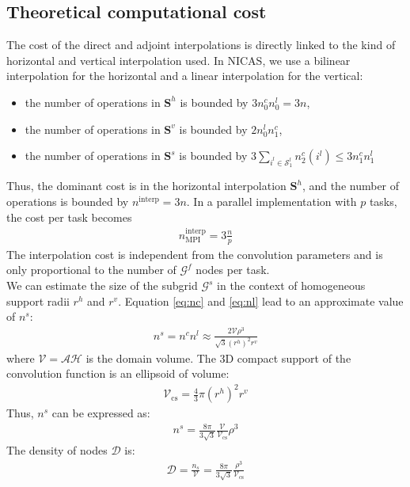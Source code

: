 \documentclass[12pt]{scrartcl}
\begin{document}
\subsection{Theoretical computational cost}
The cost of the direct and adjoint interpolations is directly linked to the kind of horizontal and vertical interpolation used. In NICAS, we use a bilinear interpolation for the horizontal and a linear interpolation for the vertical:
\begin{itemize}
\item the number of operations in $\mathbf{S}^h$ is bounded by $3 n^c_0 n^l_0 = 3n$,
\item the number of operations in $\mathbf{S}^v$ is bounded by $2 n^l_0 n^c_1$,
\item the number of operations in $\mathbf{S}^s$ is bounded by $\displaystyle 3 \sum_{i^l \in \mathcal{S}^l_1} n^c_2(i^l) \le 3 n^c_1 n^l_1$
\end{itemize}
Thus, the dominant cost is in the horizontal interpolation $\mathbf{S}^h$, and the number of operations is bounded by $n^\mathrm{interp} = 3n$. In a parallel implementation with $p$ tasks, the cost per task becomes
\begin{align}
n^\mathrm{interp}_\mathrm{MPI} = 3 \frac{n}{p}
\end{align}
The interpolation cost is independent from the convolution parameters and is only proportional to the number of $\mathcal{G}^f$ nodes per task.\\
$  $\\
We can estimate the size of the subgrid $\mathcal{G}^s$ in the context of homogeneous support radii $r^h$ and $r^v$. Equation \ref{eq:nc} and \ref{eq:nl} lead to an approximate value of $n^s$:
\begin{align}
n^s = n^c n^l \approx \frac{2 \mathcal{V} \rho^3}{\sqrt{3} \left(r^h\right)^2 r^v}
\end{align}
where $\mathcal{V} = \mathcal{A} \mathcal{H}$ is the domain volume. The 3D compact support of the convolution function is an ellipsoid of volume:
\begin{align}
\mathcal{V}_\mathrm{cs} = \frac{4}{3} \pi \left(r^h\right)^2 r^v
\end{align}
Thus, $n^s$ can be expressed as:
\begin{align}
n^s = \frac{8 \pi}{3\sqrt{3}} \frac{\mathcal{V}}{\mathcal{V}_\mathrm{cs}} \rho^3
\end{align}
The density of nodes $\mathcal{D}$ is:
\begin{align}
\mathcal{D} = \frac{n_s}{\mathcal{V}} = \frac{8\pi}{3\sqrt{3}} \frac{\rho^3}{\mathcal{V}_\mathrm{cs}}
\end{align}
\end{document}
